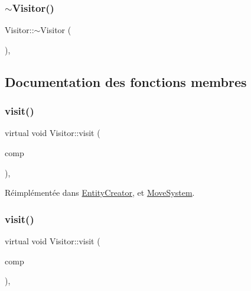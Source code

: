 \subsubsection{\texorpdfstring{$\sim$\+Visitor()}{~Visitor()}}
{\footnotesize\ttfamily Visitor\+::$\sim$\+Visitor (\begin{DoxyParamCaption}{ }\end{DoxyParamCaption})\hspace{0.3cm}{\ttfamily [inline]}, {}}



\subsection{Documentation des fonctions membres}
\mbox{\label{classVisitor_afc865e84cb1293284e6f524a00049b11}} 
\subsubsection{\texorpdfstring{visit()}{visit()}\hspace{0.1cm}{\footnotesize\ttfamily [1/5]}}
{\footnotesize\ttfamily virtual void Visitor\+::visit (\begin{DoxyParamCaption}\item[{\hyperlink{structPositionComponent}{Position\+Component} \&}]{comp }\end{DoxyParamCaption})\hspace{0.3cm}{\ttfamily [inline]}, {\ttfamily [virtual]}}



Réimplémentée dans \hyperlink{classEntityCreator_ae6e6fa03f354303f33714c875bda0c62}{Entity\+Creator}, et \hyperlink{classMoveSystem_a816baaf8d8d9db45b4c026902946bc1e}{Move\+System}.

\mbox{\label{classVisitor_aba8f1cab6bd85c2b86ed0b8103d30f45}} 
\subsubsection{\texorpdfstring{visit()}{visit()}\hspace{0.1cm}{\footnotesize\ttfamily [2/5]}}
{\footnotesize\ttfamily virtual void Visitor\+::visit (\begin{DoxyParamCaption}\item[{\hyperlink{structHealthComponent}{Health\+Component} \&}]{comp }\end{DoxyParamCaption})\hspace{0.3cm}{\ttfamily [inline]}, {\ttfamily [virtual]}}



